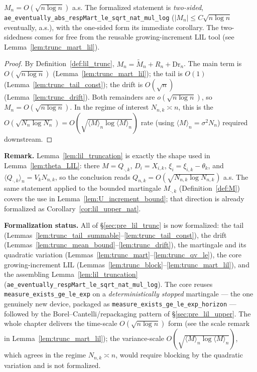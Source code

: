 \begin{lemma}\label{lem:lil_truncation}
\leanok
{}
$M_n = O(\sqrt{n\log n})$ a.s. The formalized statement is \emph{two-sided},
\texttt{ae\_eventually\_abs\_respMart\_le\_sqrt\_nat\_mul\_log} ($|M_n|\le C\sqrt{n\log n}$
eventually, a.s.), with the one-sided form its immediate corollary. The two-sidedness comes for free
from the reusable growing-increment LIL tool (see Lemma~\ref{lem:trunc_mart_lil}).
\end{lemma}
\begin{proof}\leanok
{}
By Definition~\ref{def:lil_trunc}, $M_n=\tilde M_n+R_n+\mathrm{Dr}_n$. The main term is
$O(\sqrt{n\log n})$ (Lemma~\ref{lem:trunc_mart_lil}); the tail is $O(1)$
(Lemma~\ref{lem:trunc_tail_const}); the drift is $O(\sqrt{n})$ (Lemma~\ref{lem:trunc_drift}).
Both remainders are $o(\sqrt{n\log n})$, so $M_n=O(\sqrt{n\log n})$. In the regime of interest
$N_{n,k}\asymp n$, this is the $O(\sqrt{N_n\log N_n})=O(\sqrt{\langle M\rangle_n\log\langle
M\rangle_n})$ rate (using $\langle M\rangle_n=\sigma^2 N_n$) required downstream.
\end{proof}

\textbf{Remark.} Lemma~\ref{lem:lil_truncation} is exactly the shape used in
Lemma~\ref{lem:theta_LIL}: there $M = Q_{\cdot,k}$, $D_i = X_{i,k}$,
$\xi_i = \xi_{i,k}-\theta_k$, and $\langle Q_{\cdot,k}\rangle_n = V_k N_{n,k}$, so
the conclusion reads $Q_{n,k} = O(\sqrt{N_{n,k}\log N_{n,k}})$ a.s. The same
statement applied to the bounded martingale $M_{\cdot,k}$
(Definition~\ref{def:M}) covers the use in Lemma~\ref{lem:U_increment_bound}; that direction is
already formalized as Corollary~\ref{cor:lil_upper_nat}.

\textbf{Formalization status.} All of \S\ref{sec:pre_lil_trunc} is now formalized: the tail
(Lemmas~\ref{lem:trunc_tail_summable}--\ref{lem:trunc_tail_const}), the drift
(Lemmas~\ref{lem:trunc_mean_bound}--\ref{lem:trunc_drift}), the martingale and its quadratic
variation (Lemmas~\ref{lem:trunc_mart}--\ref{lem:trunc_qv_le}), the core growing-increment LIL
(Lemmas~\ref{lem:trunc_block}--\ref{lem:trunc_mart_lil}), and the assembling
Lemma~\ref{lem:lil_truncation} (\texttt{ae\_eventually\_respMart\_le\_sqrt\_nat\_mul\_log}). The core
reuses \texttt{measure\_exists\_ge\_le\_exp} on a \emph{deterministically stopped} martingale --- the
one genuinely new device, packaged as \texttt{measure\_exists\_ge\_le\_exp\_horizon} --- followed by
the Borel--Cantelli/repackaging pattern of \S\ref{sec:pre_lil_upper}. The whole chapter delivers the
time-scale $O(\sqrt{n\log n})$ form (see the scale remark in Lemma~\ref{lem:trunc_mart_lil});
the variance-scale $O(\sqrt{\langle M\rangle_n\log\langle M\rangle_n})$, which agrees in the regime
$N_{n,k}\asymp n$, would require blocking by the quadratic variation and is not formalized.

